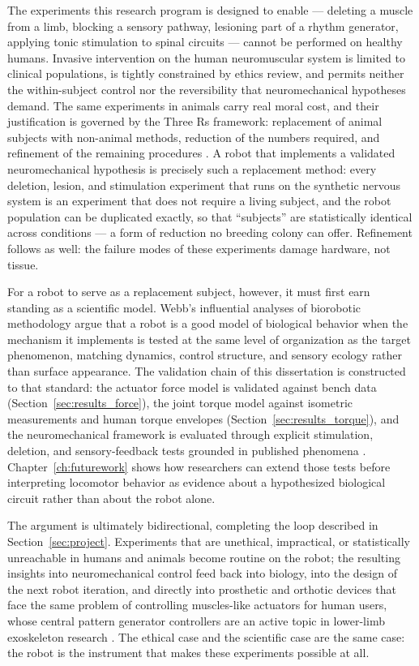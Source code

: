 The experiments this research program is designed to enable --- deleting a muscle from a limb, blocking a sensory pathway, lesioning part of a rhythm generator, applying tonic stimulation to spinal circuits --- cannot be performed on healthy humans. Invasive intervention on the human neuromuscular system is limited to clinical populations, is tightly constrained by ethics review, and permits neither the within-subject control nor the reversibility that neuromechanical hypotheses demand. The same experiments in animals carry real moral cost, and their justification is governed by the Three Rs framework: replacement of animal subjects with non-animal methods, reduction of the numbers required, and refinement of the remaining procedures \citep{russell_principles_1959, tannenbaum_russell_2015}. A robot that implements a validated neuromechanical hypothesis is precisely such a replacement method: every deletion, lesion, and stimulation experiment that runs on the synthetic nervous system is an experiment that does not require a living subject, and the robot population can be duplicated exactly, so that ``subjects'' are statistically identical across conditions --- a form of reduction no breeding colony can offer. Refinement follows as well: the failure modes of these experiments damage hardware, not tissue.

For a robot to serve as a replacement subject, however, it must first earn standing as a scientific model. Webb's influential analyses of biorobotic methodology \citep{webb_robots_2001, webb_robots_2002} argue that a robot is a good model of biological behavior when the mechanism it implements is tested at the same level of organization as the target phenomenon, matching dynamics, control structure, and sensory ecology rather than surface appearance. The validation chain of this dissertation is constructed to that standard: the actuator force model is validated against bench data (Section~\ref{sec:results_force}), the joint torque model against isometric measurements and human torque envelopes (Section~\ref{sec:results_torque}), and the neuromechanical framework is evaluated through explicit stimulation, deletion, and sensory-feedback tests grounded in published phenomena \citep{selionov_tonic_2009, rybak_modelling_2006}. Chapter~\ref{ch:futurework} shows how researchers can extend those tests before interpreting locomotor behavior as evidence about a hypothesized biological circuit rather than about the robot alone.

The argument is ultimately bidirectional, completing the loop described in Section~\ref{sec:project}. Experiments that are unethical, impractical, or statistically unreachable in humans and animals become routine on the robot; the resulting insights into neuromechanical control feed back into biology, into the design of the next robot iteration, and directly into prosthetic and orthotic devices that face the same problem of controlling muscles-like actuators for human users, whose central pattern generator controllers are an active topic in lower-limb exoskeleton research \citep{duan_gait_2024, pery_benchmarking_2026}. The ethical case and the scientific case are the same case: the robot is the instrument that makes these experiments possible at all.
